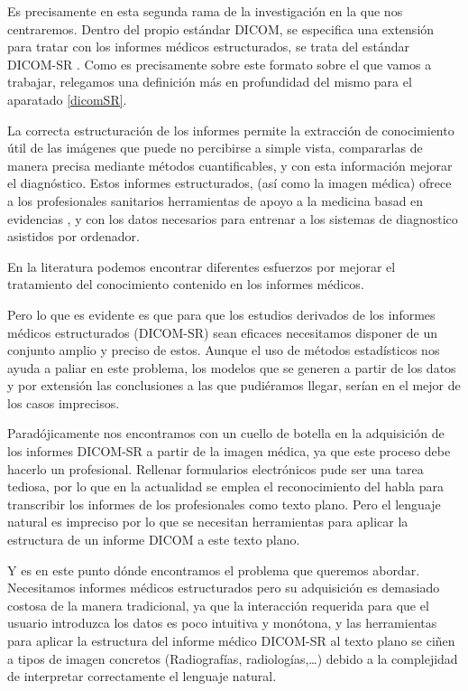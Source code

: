 Es precisamente en esta segunda rama de la investigación en la que nos centraremos. Dentro del propio estándar DICOM, se especifica una extensión para tratar con los informes médicos estructurados, se trata del estándar DICOM-SR \cite{clunie2000dicom}. Como es precisamente sobre este formato sobre el que vamos a trabajar, relegamos una definición más en profundidad del mismo para el aparatado \ref{dicomSR}.\par
La correcta estructuración de los informes permite la extracción de conocimiento útil de las imágenes que puede no percibirse a simple vista, compararlas de manera precisa mediante métodos cuantificables, y con esta información mejorar el diagnóstico.  Estos informes estructurados, (así como la imagen médica) ofrece a los profesionales sanitarios herramientas de apoyo a la medicina basad en evidencias \cite{Sackett19973, Darlenski2010553, Elphick2004525}, y con los datos necesarios para entrenar a los sistemas de diagnostico asistidos por ordenador.\medskip\par

En la literatura podemos encontrar diferentes esfuerzos por mejorar el tratamiento del conocimiento contenido en los informes médicos. \cite{BlanquerEspert:2009:COV:1528937.1529213,journals/jbi/TorresQEH12, journals/jamia/Tirado-RamosHL02} \par
Pero lo que es evidente es que para que los estudios derivados de los informes médicos estructurados (DICOM-SR) sean eficaces necesitamos disponer de un conjunto amplio y preciso de estos. Aunque el uso de métodos estadísticos nos ayuda a paliar en  este problema, los modelos que se generen a partir de los datos y por extensión las conclusiones a las que pudiéramos llegar, serían en el mejor de los casos imprecisos. \par
Paradójicamente nos encontramos con un cuello de botella en la adquisición de los informes DICOM-SR a partir de la imagen médica, ya que este proceso debe hacerlo un profesional. Rellenar formularios electrónicos pude ser una tarea tediosa, por lo que en la actualidad se emplea el reconocimiento del habla  para transcribir los informes de los profesionales como texto plano. Pero el lenguaje natural es impreciso por lo que se necesitan herramientas para aplicar la estructura de un informe DICOM a este texto plano. \cite{sevenster2012aut, 9227155, citeulike:191295}\medskip\par

Y es en este punto dónde encontramos el problema que queremos abordar. Necesitamos informes médicos estructurados pero su adquisición es demasiado costosa de la manera tradicional, ya que la interacción requerida para que el usuario introduzca los datos es poco intuitiva y monótona, y las herramientas para aplicar la estructura del informe médico DICOM-SR al texto plano se ciñen a tipos de imagen concretos (Radiografías, radiologías,\ldots) debido a la complejidad de interpretar correctamente el lenguaje natural.\medskip\par

